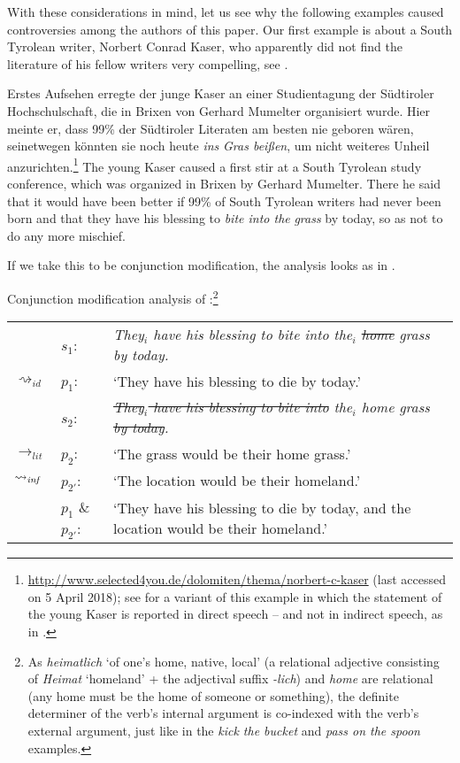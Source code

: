 \documentclass[output=paper]{langsci/langscibook}
\begin{document}
With these considerations in mind, let us see why the following examples caused controversies among the authors of this paper. Our first example is about a South Tyrolean writer, Norbert Conrad Kaser, who apparently did not find the literature of his fellow writers very compelling, see .

\ea \label{home grass}
Erstes Aufsehen erregte der junge Kaser an einer Studientagung der Süd\-tiroler Hochschulschaft, die in Brixen von Gerhard Mumelter organisiert wurde. Hier meinte er, dass 99\% der Südtiroler Literaten am besten nie geboren wären, seinetwegen könnten sie noch heute \textit{ins} \underline{} \textit{Gras beißen}, um nicht weiteres Unheil anzurichten.\footnote{\url{http://www.selected4you.de/dolomiten/thema/norbert-c-kaser} (last accessed on 5 April 2018); see \citet[][91]{stathi07} for a variant of this example in which the statement of the young Kaser is reported in direct speech -- and not in indirect speech, as in .}
\glt The young Kaser caused a first stir at a South Tyrolean study conference, which was organized in Brixen by Gerhard Mumelter. There he said that it would have been better if 99\% of South Tyrolean writers had never been born and that they have his blessing to \textit{bite into the} \underline{} \textit{grass} by today, so as not to do any more mischief.
\z

\noindent If we take this to be conjunction modification, the analysis looks as in .\largerpage[-2]\pagebreak

\ea \label{analysis1 home grass} 
Conjunction modification analysis of :\footnote{As \textit{heimatlich} `of one's home, native, local' (a relational adjective consisting of \textit{Heimat} `homeland' + the adjectival suffix \mbox{\textit{-lich}}) and \textit{home} are relational (any home must be the home of someone or something), the definite determiner of the verb's internal argument is co-indexed with the verb's external argument, just like in the \textit{kick the bucket} and \textit{pass on the spoon} examples.}\smallskip\\
\begin{tabularx}{\linewidth}[t]{@{}llQ@{}}
& 	$s_{1}$: & \textit{They$_{i}$ have his blessing to bite into the$_{i}$ \sout{home} grass by today.} \\
$\rightsquigarrow_{id}$				&	$p_{1}$: & `They have his blessing to die by today.'\medskip\\
& 	$s_{2}$: & \textit{\sout{They$_{i}$ have his blessing to bite into} the$_{i}$ home grass \sout{by today}.} \\
$\rightarrow_{lit}$	&	$p_{2}$: & `The grass would be their home grass.' \\
$\rightsquigarrow_{\text{\itshape inf}}$	&	$p_{2'}$: & `The location would be their homeland.' \medskip\\
                            &	$p_{1}$ \& $p_{2'}$: &`They have his blessing to die by today, and the location would be their homeland.' 
\end{tabularx}
\z
\end{document}
